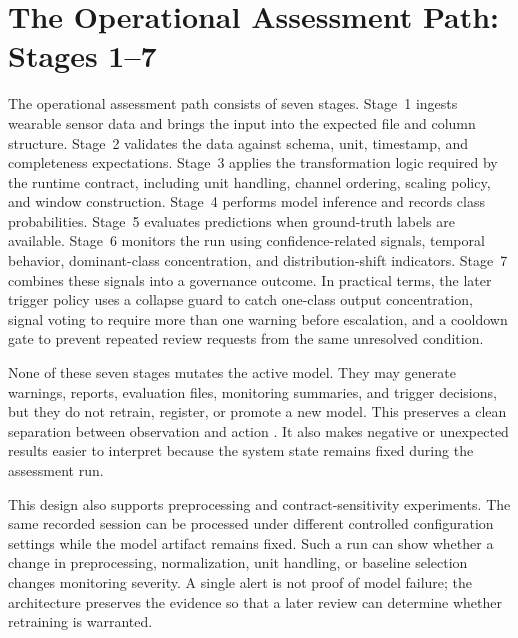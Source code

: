 \section{The Operational Assessment Path: Stages 1--7}
\label{sec:operational_assessment_path}

The operational assessment path consists of seven stages. Stage~1 ingests wearable sensor data and brings the input into the expected file and column structure. Stage~2 validates the data against schema, unit, timestamp, and completeness expectations. Stage~3 applies the transformation logic required by the runtime contract, including unit handling, channel ordering, scaling policy, and window construction. Stage~4 performs model inference and records class probabilities. Stage~5 evaluates predictions when ground-truth labels are available. Stage~6 monitors the run using confidence-related signals, temporal behavior, dominant-class concentration, and distribution-shift indicators. Stage~7 combines these signals into a governance outcome. In practical terms, the later trigger policy uses a collapse guard to catch one-class output concentration, signal voting to require more than one warning before escalation, and a cooldown gate to prevent repeated review requests from the same unresolved condition.

None of these seven stages mutates the active model. They may generate warnings, reports, evaluation files, monitoring summaries, and trigger decisions, but they do not retrain, register, or promote a new model. This preserves a clean separation between observation and action \cite{amershi2019mlops,gift2021practicalmlops}. It also makes negative or unexpected results easier to interpret because the system state remains fixed during the assessment run.

This design also supports preprocessing and contract-sensitivity experiments. The same recorded session can be processed under different controlled configuration settings while the model artifact remains fixed. Such a run can show whether a change in preprocessing, normalization, unit handling, or baseline selection changes monitoring severity. A single alert is not proof of model failure; the architecture preserves the evidence so that a later review can determine whether retraining is warranted.

